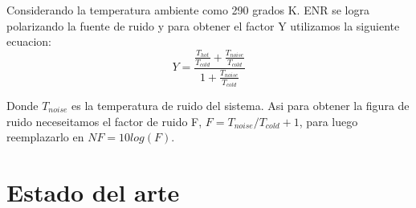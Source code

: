 Considerando la temperatura ambiente como 290 grados K. ENR se logra polarizando la fuente de ruido y para obtener el factor Y utilizamos la siguiente ecuacion:\\

\begin{equation}
    Y = \frac{\frac{T_{hot}}{T_{cold}} + \frac{T_{noise}}{T_{cold}}}{1 + \frac{T_{noise}}{T_{cold}}}
\end{equation}

Donde $T_{noise}$ es la temperatura de ruido del sistema. Asi para obtener la figura de ruido neceseitamos el factor de ruido F, $F=T_{noise}/T_{cold} +1 $, para luego reemplazarlo en $NF = 10log(F)$\cite{analogNoiseFigure}.\\


\section{Estado del arte}









